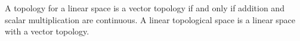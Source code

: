 A topology for a linear space is a vector topology if and only if addition and scalar multiplication are continuous. A linear topological space is a linear space with a vector topology.
